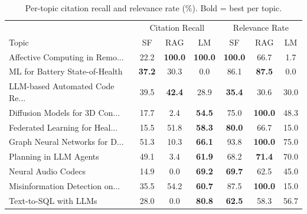 \begin{table}[t]
\centering
\scriptsize
\caption{Per-topic citation recall and relevance rate (\%). Bold = best per topic.}
\label{tab:topic-breakdown}
\begin{tabular}{l|ccc|ccc}
\toprule
 & \multicolumn{3}{c|}{Citation Recall} & \multicolumn{3}{c}{Relevance Rate} \\
Topic & SF & RAG & LM & SF & RAG & LM \\
\midrule
Affective Computing in Remo... & 22.2 & \textbf{100.0} & \textbf{100.0} & \textbf{100.0} & 66.7 & 1.7 \\
ML for Battery State-of-Health & \textbf{37.2} & 30.3 & 0.0 & 86.1 & \textbf{87.5} & 0.0 \\
LLM-based Automated Code Re... & 39.5 & \textbf{42.4} & 28.9 & \textbf{35.4} & 30.6 & 30.0 \\
Diffusion Models for 3D Con... & 17.7 & 2.4 & \textbf{54.5} & 75.0 & \textbf{100.0} & 48.3 \\
Federated Learning for Heal... & 15.5 & 51.8 & \textbf{58.3} & \textbf{80.0} & 66.7 & 15.0 \\
Graph Neural Networks for D... & 51.3 & 10.3 & \textbf{66.1} & 93.8 & \textbf{100.0} & 75.0 \\
Planning in LLM Agents & 49.1 & 3.4 & \textbf{61.9} & 68.2 & \textbf{71.4} & 70.0 \\
Neural Audio Codecs & 14.9 & 0.0 & \textbf{69.2} & \textbf{69.7} & 62.5 & 45.0 \\
Misinformation Detection on... & 35.5 & 54.2 & \textbf{60.7} & 87.5 & \textbf{100.0} & 15.0 \\
Text-to-SQL with LLMs & 28.0 & 0.0 & \textbf{80.8} & \textbf{62.5} & 58.3 & 56.7 \\
\bottomrule
\end{tabular}
\end{table}
